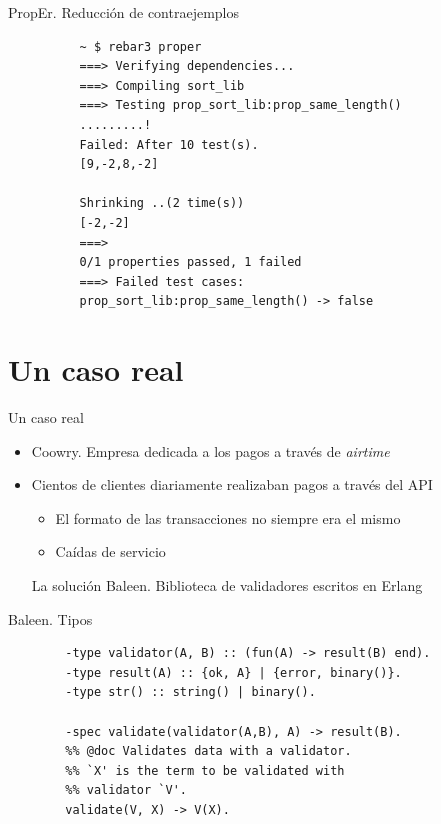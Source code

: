 \documentclass{beamer}
\begin{document}
      \begin{frame}[fragile]{PropEr. Reducción de contraejemplos}
        \begin{verbatim}
          ~ $ rebar3 proper
          ===> Verifying dependencies...
          ===> Compiling sort_lib
          ===> Testing prop_sort_lib:prop_same_length()
          .........!
          Failed: After 10 test(s).
          [9,-2,8,-2]

          Shrinking ..(2 time(s))
          [-2,-2]
          ===>
          0/1 properties passed, 1 failed
          ===> Failed test cases:
          prop_sort_lib:prop_same_length() -> false
        \end{verbatim}
      \end{frame}

  \section{Un caso real}
    \begin{frame}{Un caso real}
      \begin{itemize}
        \item Coowry. Empresa dedicada a los pagos a través de \textit{airtime}
        \item Cientos de clientes diariamente realizaban pagos a través del API
        \begin{itemize}
          \item El formato de las transacciones no siempre era el mismo
          \item Caídas de servicio
        \end{itemize}
        \pause
        \begin{exampleblock}{La solución}
          Baleen. Biblioteca de validadores escritos en Erlang
        \end{exampleblock}
      \end{itemize}
    \end{frame}

    \begin{frame}[fragile]{Baleen. Tipos}
      \begin{verbatim}
        -type validator(A, B) :: (fun(A) -> result(B) end).
        -type result(A) :: {ok, A} | {error, binary()}.
        -type str() :: string() | binary().

        -spec validate(validator(A,B), A) -> result(B).
        %% @doc Validates data with a validator.
        %% `X' is the term to be validated with
        %% validator `V'.
        validate(V, X) -> V(X).
      \end{verbatim}
    \end{frame}
\end{document}
